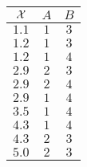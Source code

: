 \scriptsize
\begin{tabular}{ccc}
\toprule
$\mathcal{X}$ & $A$ & $B$ \\ \midrule
$1.1$ & $1$ & $3$ \\ 
$1.2$ & $1$ & $3$ \\ 
$1.2$ & $1$ & $4$ \\ 
$2.9$ & $2$ & $3$ \\ 
$2.9$ & $2$ & $4$ \\ 
$2.9$ & $1$ & $4$ \\ 
$3.5$ & $1$ & $4$ \\ 
$4.3$ & $1$ & $4$ \\ 
$4.3$ & $2$ & $3$ \\ 
$5.0$ & $2$ & $3$ \\ \bottomrule
\end{tabular}